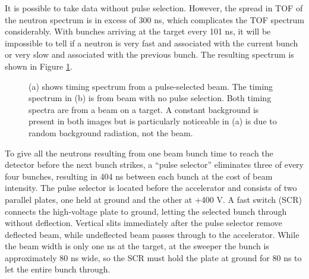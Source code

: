 
It is possible to take data without pulse selection.  However, the spread in TOF of the neutron spectrum is in excess of 300 ns, which complicates the TOF spectrum considerably.  With bunches arriving at the target every 101 ns, it will be impossible to tell if a neutron is very fast and associated with the current bunch or very slow and associated with the previous bunch.  The resulting spectrum is shown in Figure \ref{fig:PSvsNPS_TOF}.

\begin{figure}[htp]
\centering
{}
\label{fig:PSvsNPS_TOF}
\caption{(a) shows timing spectrum from a pulse-selected beam.  The timing spectrum in (b) is from beam with no pulse selection.  Both timing spectra are from a  beam on a  target.  A constant background is present in both images but is particularly noticeable in (a) is due to random background radiation, not the beam.}
\end{figure}

To give all the neutrons resulting from one beam bunch time to reach the detector before the next bunch strikes, a ``pulse selector'' eliminates three of every four bunches, resulting in 404 ns between each bunch at the cost of beam intensity.  The pulse selector is located before the accelerator and consists of two parallel plates, one held at ground and the other at +400 V.  A fast switch (SCR) connects the high-voltage plate to ground, letting the selected bunch through without deflection.  Vertical slits immediately after the pulse selector remove deflected beam, while undeflected beam passes through to the accelerator.  While the beam width is only one ns at the target, at the sweeper the bunch is approximately 80 ns wide, so the SCR must hold the plate at ground for 80 ns to let the entire bunch through.

